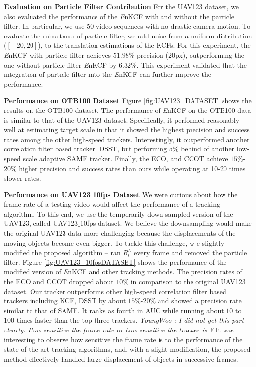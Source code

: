 \documentclass[10pt,twocolumn,letterpaper]{article}
\begin{document}
\textbf{Evaluation on Particle Filter Contribution} For the UAV123
dataset, we also evaluated the performance of the {\it E}nKCF with and
without the particle filter. In particular, we use 50 video sequences
with no drastic camera motion. To evaluate the robustness of particle
filter, we add noise from a uniform distribution ($[-20,20]$), to the
translation estimations of the KCFs. For this experiment, the {\it
  E}nKCF with particle filter achieves $51.98\%$ precision ($20$px),
outperforming the one without particle filter {\it E}nKCF by
$6.32\%$. This experiment validated that the integration of particle
filter into the {\it E}nKCF can further improve the performance.

\textbf{Performance on OTB100 Dataset} Figure \ref{fig:UAV123_DATASET}
shows the results on the OTB100 dataset. The performance of {\it
  E}nKCF on the OTB100 data is similar to that of the UAV123
dataset. Specifically, it performed reasonably well at estimating
target scale in that it showed the highest precision and success rates
among the other high-speed trackers. Interestingly, it outperformed
another correlation filter based tracker, DSST, but performing $5\%$
behind of another low-speed scale adaptive SAMF tracker. Finally, the
ECO, and CCOT achieve $15\%$-$20\%$ higher precision and success rates
than ours while operating at 10-20 times slower rates.

\textbf{Performance on UAV123$\_$10fps Dataset} We were curious about
how the frame rate of a testing video would affect the performance of
a tracking algorithm. To this end, we use the temporarily down-sampled version
of the UAV123, called UAV123$\_$10fps dataset. We believe the downsampling
would make the original UAV123 data more challenging because the
displacements of the moving objects become even bigger. To tackle this challenge, w
e slightly modified the proposed algorithm -- ran $R_{t}^{L}$ every frame and
removed the particle filter. Figure \ref{fig:UAV123_10fpsDATASET}
shows the performance of the modified version of {\it E}nKCF and other
tracking methods. The precision rates of the ECO and CCOT dropped
about $10\%$ in comparison to the original UAV123 dataset. Our tracker
outperforms other high-speed correlation filter based trackers
including KCF, DSST by about $15\%$-$20\%$ and showed a precision rate
similar to that of SAMF. It ranks as fourth in AUC while running about
$10$ to $100$ times faster than the top three trackers. 
\textit{YoungWoo : I did not get this part clearly. How sensitive the frame rate 
or how sensitive the tracker is
?} It was interesting to observe how sensitive the frame rate is to the
performance of the state-of-the-art tracking algorithms, and, with a
slight modification, the proposed method effectively handled large
displacement of objects in successive frames. 
\end{document}
